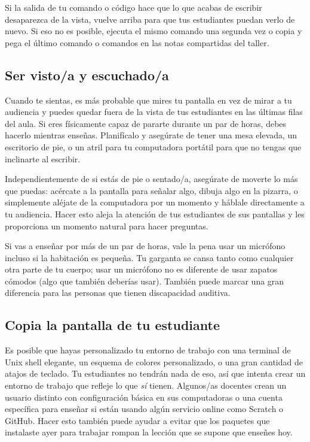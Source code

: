 Si la salida de tu comando o código hace que lo que acabas de escribir desaparezca de la vista,
vuelve arriba para que tus estudiantes puedan verlo de nuevo.
Si eso no es posible,
ejecuta el mismo comando una segunda vez
o copia y pega el último comando o comandos en las notas compartidas del taller.

\subsection*{Ser visto/a y escuchado/a}

Cuando te sientas,
es más probable que mires tu pantalla en vez de mirar a tu audiencia
y puedes quedar fuera de la vista de tus estudiantes en las últimas filas del aula.
Si eres físicamente capaz de pararte durante un par de horas,
debes hacerlo mientras enseñas.
Planifícalo y asegúrate de tener una mesa elevada, 
un escritorio de pie,
o un atril
para tu computadora portátil
para que no tengas que inclinarte al escribir.

Independientemente de si estás de pie o sentado/a,
asegúrate de moverte lo más que puedas:
acércate a la pantalla para señalar algo,
dibuja algo en la pizarra,
o simplemente aléjate de la computadora por un momento y háblale directamente a tu audiencia.
Hacer esto aleja la atención de tus estudiantes de sus pantallas
y les proporciona un momento natural para hacer preguntas.

Si vas a enseñar por más de un par de horas,
vale la pena usar un micrófono incluso si la habitación es pequeña.
Tu garganta se cansa tanto como cualquier otra parte de tu cuerpo;
usar un micrófono no es diferente de usar zapatos cómodos 
(algo que también deberías usar).
También puede marcar una gran diferencia para las personas que tienen discapacidad auditiva.

\subsection*{Copia la pantalla de tu estudiante}

Es posible que hayas personalizado tu entorno de trabajo con una terminal de Unix shell elegante,
un esquema de colores personalizado,
o una gran cantidad de atajos de teclado.
Tu estudiantes no tendrán nada de eso,
así que intenta crear un entorno de trabajo que refleje lo que \emph{sí} tienen.
Algunos/as docentes crean un usuario distinto con configuración básica en sus computadoras
o una cuenta específica para enseñar 
si están usando algún servicio online como Scratch o GitHub.
Hacer esto también puede ayudar a evitar que los paquetes que instalaste ayer para trabajar 
rompan la lección que se supone que enseñes hoy.

